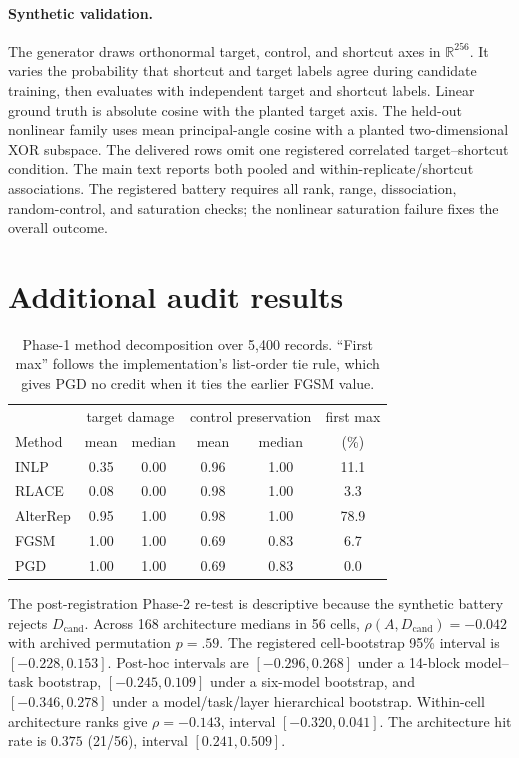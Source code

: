\documentclass{article}
\newcommand{\Dcand}{D_{\mathrm{cand}}}
\begin{document}
\paragraph{Synthetic validation.}
The generator draws orthonormal target, control, and shortcut axes in $\mathbb R^{256}$. It varies the probability that shortcut and target labels agree during candidate training, then evaluates with independent target and shortcut labels. Linear ground truth is absolute cosine with the planted target axis. The held-out nonlinear family uses mean principal-angle cosine with a planted two-dimensional XOR subspace. The delivered rows omit one registered correlated target--shortcut condition. The main text reports both pooled and within-replicate/shortcut associations. The registered battery requires all rank, range, dissociation, random-control, and saturation checks; the nonlinear saturation failure fixes the overall outcome.

\section{Additional audit results}

\begin{table}[ht]
\centering
\small
\begin{tabular}{lccccc}
\toprule
 & \multicolumn{2}{c}{target damage} & \multicolumn{2}{c}{control preservation} & first max \\
Method & mean & median & mean & median & (\%) \\
\midrule
INLP     & 0.35 & 0.00 & 0.96 & 1.00 & 11.1 \\
RLACE    & 0.08 & 0.00 & 0.98 & 1.00 & 3.3 \\
AlterRep & 0.95 & 1.00 & 0.98 & 1.00 & 78.9 \\
FGSM     & 1.00 & 1.00 & 0.69 & 0.83 & 6.7 \\
PGD      & 1.00 & 1.00 & 0.69 & 0.83 & 0.0 \\
\bottomrule
\end{tabular}
\caption{Phase-1 method decomposition over 5,400 records. ``First max'' follows the implementation's list-order tie rule, which gives PGD no credit when it ties the earlier FGSM value.}
\label{tab:methods-app}
\end{table}

The post-registration Phase-2 re-test is descriptive because the synthetic battery rejects $\Dcand$. Across 168 architecture medians in 56 cells, $\rho(A,\Dcand)=-0.042$ with archived permutation $p=.59$. The registered cell-bootstrap 95\% interval is $[-0.228,0.153]$. Post-hoc intervals are $[-0.296,0.268]$ under a 14-block model--task bootstrap, $[-0.245,0.109]$ under a six-model bootstrap, and $[-0.346,0.278]$ under a model/task/layer hierarchical bootstrap. Within-cell architecture ranks give $\rho=-0.143$, interval $[-0.320,0.041]$. The architecture hit rate is $0.375$ (21/56), interval $[0.241,0.509]$.
\end{document}
